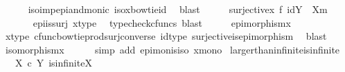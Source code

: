 \begin{isabellebody}
\ \ \ \ \isamarkupfalse%
\ iso{\isacharunderscore}{\kern0pt}imp{\isacharunderscore}{\kern0pt}epi{\isacharunderscore}{\kern0pt}and{\isacharunderscore}{\kern0pt}monic\ iso{\isacharunderscore}{\kern0pt}x{\isacharunderscore}{\kern0pt}bowtie{\isacharunderscore}{\kern0pt}id\ \isamarkupfalse%
\ blast\isanewline
\ \ \isamarkupfalse%
\ \isamarkupfalse%
\ {\isachardoublequoteopen}surjective{\isacharparenleft}{\kern0pt}x\ {\isasymbowtie}\isactrlsub f\ id{\isacharparenleft}{\kern0pt}Y\ {\isasymsetminus}\ {\isacharparenleft}{\kern0pt}X{\isacharcomma}{\kern0pt}m{\isacharparenright}{\kern0pt}{\isacharparenright}{\kern0pt}{\isacharparenright}{\kern0pt}{\isachardoublequoteclose}\isanewline
\ \ \ \ \isamarkupfalse%
\ \ epi{\isacharunderscore}{\kern0pt}is{\isacharunderscore}{\kern0pt}surj\ x{\isacharunderscore}{\kern0pt}type\ \isamarkupfalse%
\ {\isacharparenleft}{\kern0pt}typecheck{\isacharunderscore}{\kern0pt}cfuncs{\isacharcomma}{\kern0pt}\ blast{\isacharparenright}{\kern0pt}\isanewline
\ \ \isamarkupfalse%
\ \isamarkupfalse%
\ {\isachardoublequoteopen}epimorphism{\isacharparenleft}{\kern0pt}x{\isacharparenright}{\kern0pt}{\isachardoublequoteclose}\isanewline
\ \ \ \ \isamarkupfalse%
\ x{\isacharunderscore}{\kern0pt}type\ cfunc{\isacharunderscore}{\kern0pt}bowtieprod{\isacharunderscore}{\kern0pt}surj{\isacharunderscore}{\kern0pt}converse\ id{\isacharunderscore}{\kern0pt}type\ surjective{\isacharunderscore}{\kern0pt}is{\isacharunderscore}{\kern0pt}epimorphism\ \isamarkupfalse%
\ blast\isanewline
\ \ \isamarkupfalse%
\ \isamarkupfalse%
\ {\isachardoublequoteopen}isomorphism{\isacharparenleft}{\kern0pt}x{\isacharparenright}{\kern0pt}{\isachardoublequoteclose}\isanewline
\ \ \ \ \isamarkupfalse%
\ {\isacharparenleft}{\kern0pt}simp\ add{\isacharcolon}{\kern0pt}\ epi{\isacharunderscore}{\kern0pt}mon{\isacharunderscore}{\kern0pt}is{\isacharunderscore}{\kern0pt}iso\ x{\isacharunderscore}{\kern0pt}mono{\isacharparenright}{\kern0pt}\isanewline
{}\isamarkupfalse%
%
\endisatagproof
{\isafoldproof}%
%
\isadelimproof
\isanewline
%
\endisadelimproof
\isanewline
{}\isamarkupfalse%
\ larger{\isacharunderscore}{\kern0pt}than{\isacharunderscore}{\kern0pt}infinite{\isacharunderscore}{\kern0pt}is{\isacharunderscore}{\kern0pt}infinite{\isacharcolon}{\kern0pt}\isanewline
\ \ \ {\isachardoublequoteopen}X\ {\isasymle}\isactrlsub c\ Y{\isachardoublequoteclose}\ {\isachardoublequoteopen}is{\isacharunderscore}{\kern0pt}infinite{\isacharparenleft}{\kern0pt}X{\isacharparenright}{\kern0pt}{\isachardoublequoteclose}\ \isanewline

\end{isabellebody}
